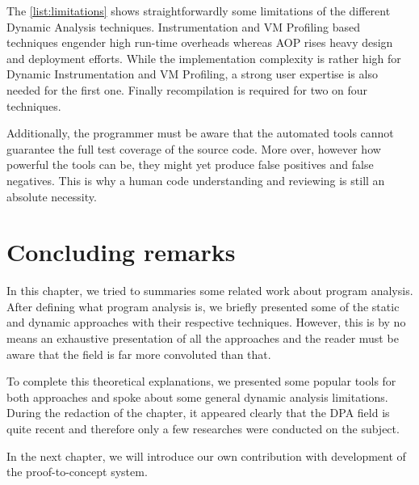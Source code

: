 The \autoref{list:limitations} shows straightforwardly some limitations of the different Dynamic Analysis techniques. Instrumentation and VM Profiling based techniques engender high run-time overheads whereas AOP rises heavy design and deployment efforts. While the implementation complexity is rather high for Dynamic Instrumentation and VM Profiling, a strong user expertise is also needed for the first one. Finally recompilation is required for two on four techniques.

Additionally, the programmer must be aware that the automated tools cannot guarantee the full test coverage of the source code. More over, however how powerful the tools can be, they might yet produce false positives and false negatives. This is why a human code understanding and reviewing is still an absolute necessity.

\section{Concluding remarks}

In this chapter, we tried to summaries some related work about program analysis. After defining what program analysis is, we briefly presented some of the static and dynamic approaches with their respective techniques. However, this is by no means an exhaustive presentation of all the approaches and the reader must be aware that the field is far more convoluted than that. 

To complete this theoretical explanations, we presented some popular tools for both approaches and spoke about some general dynamic analysis limitations. During the redaction of the chapter, it appeared clearly that the DPA field is quite recent and therefore only a few researches were conducted on the subject. 

In the next chapter, we will introduce our own contribution with  development of the proof-to-concept system.
